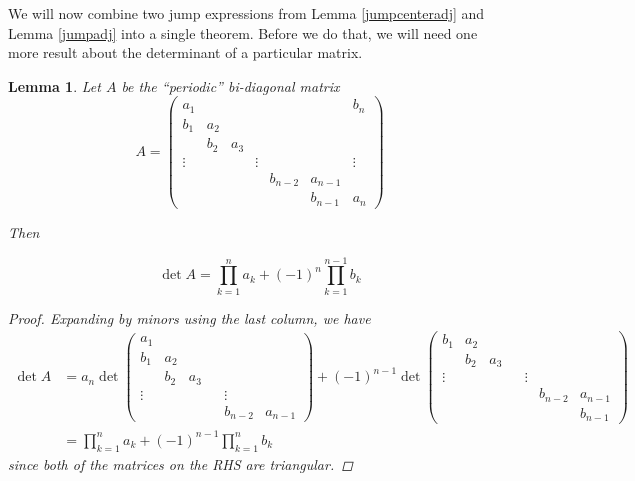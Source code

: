 \documentclass[12pt]{article}
\newtheorem{lemma}{Lemma}
\begin{document}
We will now combine two jump expressions from Lemma \ref{jumpcenteradj} and Lemma \ref{jumpadj} into a single theorem. Before we do that, we will need one more result about the determinant of a particular matrix.


\begin{lemma}\label{bidiag}
Let $A$ be the ``periodic'' bi-diagonal matrix
\begin{equation}
A = \begin{pmatrix}
a_1 & & & & & & b_n \\
b_1 & a_2 \\
& b_2 & a_3 \\
\vdots & & & \vdots & &&  \vdots \\
& & & & b_{n-2} & a_{n-1} \\
& & & & & b_{n-1} & a_n
\end{pmatrix}
\end{equation}

Then 

\begin{equation}
\det{A} = \prod_{k = 1}^n a_k + (-1)^n \prod_{k = 1}^{n-1} b_k
\end{equation}

\begin{proof}
Expanding by minors using the last column, we have
\begin{align*}
\det A &= a_n \det
\begin{pmatrix}
a_1 \\
b_1 & a_2 \\
& b_2 & a_3 \\
\vdots & & & & \vdots \\
& & & & b_{n-2} & a_{n-1}
\end{pmatrix}
+ (-1)^{n-1} \det
\begin{pmatrix}
b_1 & a_2 \\
& b_2 & a_3 \\
\vdots & & & & \vdots \\
& & & & & b_{n-2} & a_{n-1} \\
& & & & & & b_{n-1}
\end{pmatrix} \\
&= \prod_{k = 1}^n a_k + (-1)^{n-1} \prod_{k = 1}^n b_k
\end{align*}
since both of the matrices on the RHS are triangular.
\end{proof}
\end{lemma}

\end{document}
